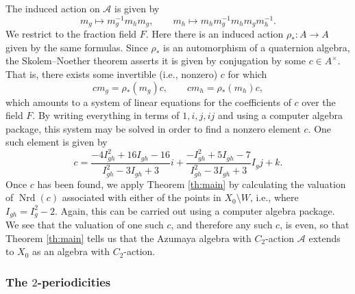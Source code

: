 \documentclass[reqno,oneside,dvipsnames,pdfnames,final]{amsart}
\theoremstyle{definition}
\newcommand{\sh}[1]{\mathcal{#1}}
\newcommand{\Nrd}{\operatorname{Nrd}}
\newcommand{\sm}{\setminus}
\begin{document}
The induced action on $\sh A$ is given by
\[
   m_g \mapsto m_g^{-1} m_h m_g, \qquad m_h \mapsto m_h m_g^{-1} m_h m_g m_h^{-1}.
\]
We restrict to the fraction field $F$. Here there is an induced action $\rho_* : A \to A$ given by the same formulas. Since $\rho_*$ is an automorphism of a quaternion algebra, the Skolem--Noether theorem asserts it is given by conjugation by some $c \in A^\times$. That is, there exists some invertible (i.e., nonzero) $c$ for which
\[ c m_g  =  \rho_*(m_g) c , \qquad c m_h  =  \rho_*(m_h) c, \]
which amounts to a system of linear equations for the coefficients of $c$ over the field $F$. By writing everything in terms of $1,i,j, ij$ and using a computer algebra package, this system may be solved in order to find a nonzero element $c$. One such element is given by
\[ c = \frac{-4I_{gh}^2 + 16 I_{gh} - 16}{I_{gh}^2 - 3 I_{gh} + 3} i + \frac{-I_{gh}^2 + 5 I_{gh} -
    7}{I_{gh}^2 - 3 I_{gh} + 3} I_g j + k. \]
Once $c$ has been found, we apply Theorem \ref{th:main} by calculating the valuation of $\Nrd(c)$ associated with either of the points in $X_0 \sm W$, i.e., where $I_{gh}=I_g^2-2$. Again, this can be carried out using a computer algebra package. We see that the valuation of one such $c$, and therefore any such $c$, is even, so that Theorem \ref{th:main} tells us that the Azumaya algebra with $C_2$-action $\sh A$ extends to $X_0$ as an algebra with $C_2$-action.



\subsubsection{The $2$-periodicities}
\label{sec:2-period}
\end{document}
